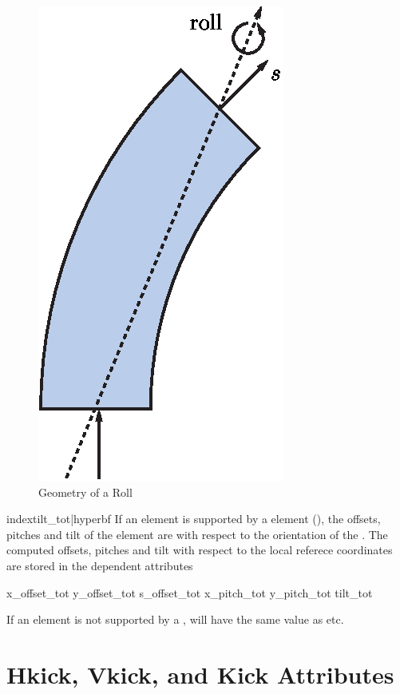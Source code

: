 \begin{figure}[ht]
  \centering
  \includegraphics{roll.eps}
  \caption{Geometry of a Roll}
  \label{f:roll}
\end{figure}

index{tilt_tot|hyperbf}
If an element is supported by a  element (),
the offsets, pitches and tilt of the element are with respect to the
orientation of the . The computed offsets, pitches and tilt with
respect to the local referece coordinates are stored in the dependent attributes
\begin{example}
  x_offset_tot
  y_offset_tot
  s_offset_tot
  x_pitch_tot
  y_pitch_tot
  tilt_tot
\end{example}
If an element is not supported by a , 
will have the same value as  etc.

\section{Hkick, Vkick, and Kick Attributes}
\label{s:kick}


